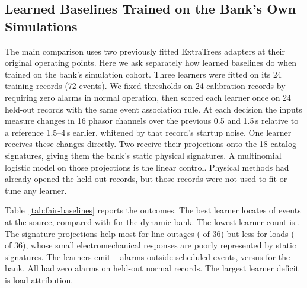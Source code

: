 \subsection{Learned Baselines Trained on the Bank's Own Simulations}
\label{sec:fair-baselines}
The main comparison uses two previously fitted ExtraTrees adapters at their
original operating points. Here we ask separately how learned baselines do
when trained on the bank's simulation cohort. Three learners were fitted
on its 24 training records (72 events). We fixed thresholds on 24
calibration records by requiring zero alarms in normal operation, then
scored each learner once on 24 held-out records with the same event
association rule. At each decision the inputs measure changes in
16 phasor channels over the previous 0.5 and 1.5\,s relative
to a reference 1.5--4\,s earlier, whitened by that record's startup noise.
One learner receives these changes directly. Two receive their projections
onto the 18 catalog signatures, giving them the bank's static physical
signatures. A multinomial logistic model on those projections is the linear
control. Physical methods had already opened the held-out records, but
those records were not used to fit or tune any learner.

Table~\ref{tab:fair-baselines} reports the outcomes. The best learner
locates \FBBestTop{} of \FBEvents{} events at the source, compared with
\FBBankTop{} for the dynamic bank. The lowest learner count is \FBWorstTop{}. The
signature projections help most for line outages (\FBFisLines{} of 36)
but less for loads (\FBFisLoads{} of 36), whose small electromechanical
responses are poorly represented by static signatures. The learners emit
\FBBestExtras{}--\FBWorstExtras{} alarms outside scheduled events, versus
\FBBankExtras{} for the bank. All had zero alarms on held-out normal
records. The largest learner deficit is load attribution.

